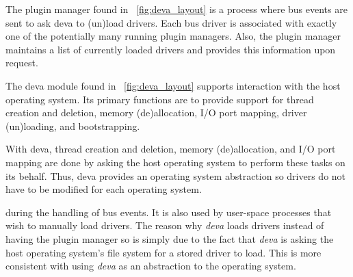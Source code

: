 The {\important plugin manager} found in \figurename~\ref{fig:deva_layout} is a process where bus events are sent to ask
deva to (un)load drivers.  Each bus driver is associated with exactly one
of the potentially many running plugin managers.  Also, the plugin
manager maintains a list of currently loaded drivers and provides this
information upon request.

The {\important deva} module found in \figurename~\ref{fig:deva_layout}
supports interaction with the host operating
system.  Its primary functions are to provide support for thread creation
and deletion, memory (de)allocation, I/O port mapping, driver (un)loading,
and bootstrapping.

With {\important deva}, thread creation and deletion, memory (de)allocation,
and I/O port mapping are done by asking the host operating system to perform
these tasks on its behalf.  Thus, {\important deva} provides an operating
system abstraction so drivers do not have to be modified for each operating
system.

during the handling of bus events.  It is also used by user-space
processes that wish to manually load drivers.  The reason why {\em
deva} loads drivers instead of having the plugin manager so is simply
due to the fact that {\em deva} is asking the host operating system's
file system for a stored driver to load.  This is more consistent with
using {\em deva} as an abstraction to the operating system.


